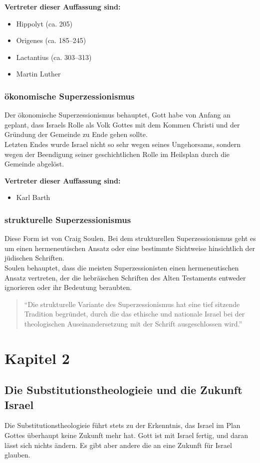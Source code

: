 \documentclass[fontsize=14pt]{../../inc/mybib}
\newcommand{\sz}{Superzessionismus}
\newcommand{\sts}{Substitutionstheologie}
\begin{document}
    \textbf{Vertreter dieser Auffassung sind:}
    \begin{itemize}
        \item Hippolyt (ca. 205)
        \item Origenes (ca. 185--245)
        \item Lactantius (ca. 303--313)
        \item Martin Luther
    \end{itemize}
    \subsubsection{ökonomische \sz}
    Der ökonomische \sz{} behauptet, Gott habe von Anfang an geplant, dass Israels Rolle als Volk Gottes mit dem Kommen Christi und der Gründung der Gemeinde zu Ende gehen sollte.\\
    Letzten Endes wurde Israel nicht so sehr wegen seines Ungehorsams, sondern wegen der Beendigung seiner geschichtlichen Rolle im Heilsplan durch die Gemeinde abgelöst.

    \textbf{Vertreter dieser Auffassung sind:}
    \begin{itemize}        
        \item Karl Barth
    \end{itemize}
    \subsubsection{strukturelle \sz}
    Diese Form ist von Craig Soulen. Bei dem strukturellen \sz{} geht es um einen hermeneutischen Ansatz oder eine bestimmte Sichtweise hinsichtlich der jüdischen Schriften.\\
    Soulen behauptet, dass die meisten Superzessionisten einen hermeneutischen Ansatz vertreten, der die hebräischen Schriften des Alten Testaments entweder ignorieren oder ihr Bedeutung beraubten.
    \begin{quote}
        \enquote{Die strukturelle Variante des \sz{} hat eine tief sitzende Tradition begründet, durch die das ethische und nationale Israel bei der theologischen Auseinandersetzung mit der Schrift ausgeschlossen wird.}
    \end{quote}
    \section{Kapitel 2}
    \subsection{Die \sts ie und die Zukunft Israel}
    Die \sts ie führt stets zu der Erkenntnis, das Israel im Plan Gottes überhaupt keine Zukunft mehr hat. Gott ist mit Israel fertig, und daran lässt sich nichts ändern.
    Es gibt aber andere die an eine Zukunft für Israel glauben.
\end{document}
